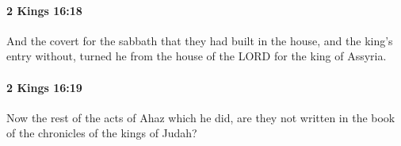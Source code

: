 		\paragraph{2 Kings 16:18} %
			\label{2KINGS-16-18}

			And the covert for the sabbath that they had built in the house, and the king’s entry without, turned he from the house of the LORD for the king of Assyria.


		\paragraph{2 Kings 16:19} %
			\label{2KINGS-16-19}

			Now the rest of the acts of Ahaz which he did, are they not written in the book of the chronicles of the kings of Judah?



